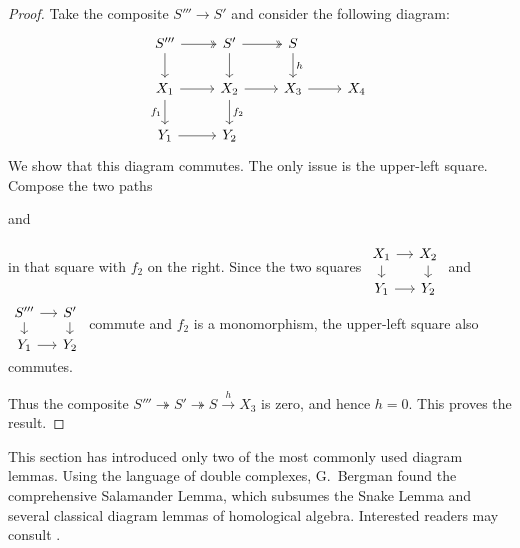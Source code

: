 \begin{proof}
	Take the composite $S'''\to S'$ and consider the following diagram:
	\[\begin{tikzcd}
		S''' \arrow[twoheadrightarrow, r] \arrow[d] & S' \arrow[twoheadrightarrow, r] \arrow[d] & S \arrow[d, "h"] & \\
		X_1 \arrow[r] \arrow[d, "f_1"'] & X_2 \arrow[r] \arrow[d, "f_2"] & X_3 \arrow[r] & X_4 \\
		Y_1 \arrow[r] & Y_2 & &
	\end{tikzcd}\]
	We show that this diagram commutes. The only issue is the upper-left square.
	Compose the two paths
	and
	in that square with $f_2$ on the right. Since the two squares
	$\begin{tikzcd}[row sep=small, column sep=small]
		X_1 \arrow[r] \arrow[d] & X_2 \arrow[d] \\
		Y_1 \arrow[r] & Y_2
	\end{tikzcd}$ and
	$\begin{tikzcd}[row sep=small, column sep=small]
		S''' \arrow[r] \arrow[d] & S' \arrow[d] \\
		Y_1 \arrow[r] & Y_2
	\end{tikzcd}$
	commute and $f_2$ is a monomorphism, the upper-left square also commutes.
	
	Thus the composite
	$S'''\twoheadrightarrow S'\twoheadrightarrow S\xrightarrow{h}X_3$ is zero,
	and hence $h=0$. This proves the result.
\end{proof}

This section has introduced only two of the most commonly used diagram lemmas.
Using the language of double complexes, G.\ Bergman found the comprehensive
Salamander Lemma, which subsumes the Snake Lemma and several classical diagram
lemmas of homological algebra. Interested readers may consult \cite{Be12}.
